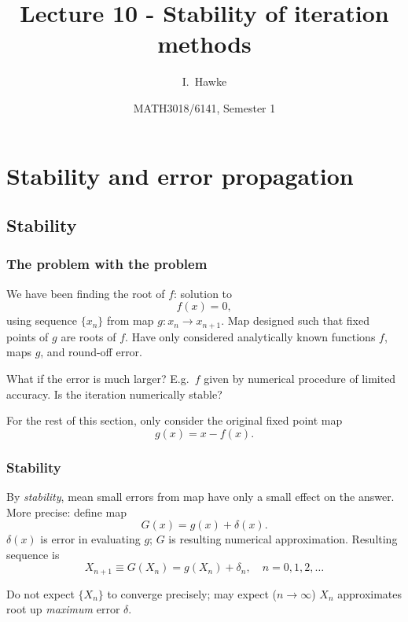 \documentclass{beamer}
\title[Lecture 10] %
{Lecture 10 - Stability of iteration methods}
\author[I. Hawke] %
{I.~Hawke}
\institute[University of Southampton] %
{
  School of Mathematics, \\
  University of Southampton, UK
}
\date[Semester 1] %
{MATH3018/6141, Semester 1}
\begin{document}
\begin{frame}
  \titlepage
\end{frame}


\section{Stability and error propagation}

\subsection{Stability}

\begin{frame}
  \frametitle{The problem with the problem}

  We have been finding the root of $f$: solution to
  \begin{equation*}
    f(x) = 0,
  \end{equation*}
  using sequence $\{x_n\}$ from map $g : x_n \rightarrow x_{n+1}$. Map
  designed such that fixed points of $g$ are roots of $f$. Have only
  considered analytically known functions $f$, maps $g$, and round-off
  error. \pause

  \vspace{1ex}

  What if the error is much larger? E.g.\ $f$ given by numerical
  procedure of limited accuracy. Is the iteration numerically stable? \pause

  \vspace{1ex}

  For the rest of this section, only consider the original fixed
  point map
  \begin{equation*}
    g(x) = x - f(x).
  \end{equation*}

\end{frame}

\begin{frame}
  \frametitle{Stability}

  By \emph{stability}, mean small errors from map have only a small
  effect on the answer. \pause More precise: define map
  \begin{equation*}
    G(x) = g(x) + \delta(x).
  \end{equation*}
  $\delta(x)$ is error in evaluating $g$; $G$ is resulting
  numerical approximation. Resulting sequence is
  \begin{equation*}
    X_{n+1} \equiv G(X_n) = g(X_n) + \delta_n, \quad n = 0, 1, 2,
    \dots
  \end{equation*} \pause

  Do not expect $\{X_n\}$ to converge precisely; may expect ($n \to
  \infty$) $X_n$ approximates root up \emph{maximum} error $\delta$.

\end{frame}
\end{document}
